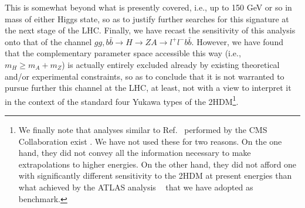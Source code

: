 This is somewhat beyond what is presently covered, i.e.,  up to 150 GeV or so in mass of either Higgs state, so as to justify further searches for this signature at the next stage of the LHC. Finally, we have recast the sensitivity of this analysis onto that of the channel  $gg,b\bar b\to H\to ZA\to l^+l^-b\bar b$. However, we have found that the complementary parameter space accessible this way (i.e., $m_H\ge  m_A+m_Z$) is actually entirely excluded already by existing theoretical and/or experimental constraints, so as to conclude that it is not warranted to pursue further this channel at the LHC, at least, not with a view to interpret it in the context of the standard four Yukawa types of the 2HDM\footnote{We finally note that analyses similar to Ref.~\cite{Aaboud:2018eoy}
performed by the CMS Collaboration exist \cite{Khachatryan:2016are,Sirunyan:2019wrn}. We have not used these for two reasons. On the one hand, they did not convey all the  information necessary to make  extrapolations to higher energies. On the other hand, they did not afford one with significantly different sensitivity to the 2HDM at present energies than what achieved by the ATLAS analysis ~\cite{Aaboud:2018eoy} that we have adopted as benchmark.}.


